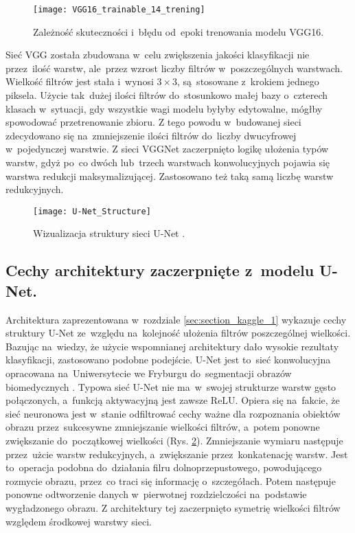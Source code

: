 {\begin{figure}[h!]
	\centering
	\centering
		\texttt{[image: VGG16\_trainable\_14\_trening]}	
	\caption{Zależność skuteczności i~błędu od~epoki trenowania modelu VGG16.}
	\label{fig:VGG16_trainable_14_trening}
\end{figure}

Sieć VGG została zbudowana w~celu zwiększenia jakości klasyfikacji nie przez~ilość warstw, ale~przez wzrost liczby filtrów w~poszczególnych warstwach. Wielkość filtrów jest stała i~wynosi $3\times3$, są~stosowane z~krokiem jednego piksela. Użycie tak~dużej ilości filtrów do~stosunkowo małej bazy o~czterech klasach w~sytuacji, gdy wszystkie wagi modelu byłyby edytowalne, mógłby spowodować przetrenowanie zbioru. Z tego powodu w~budowanej sieci zdecydowano się na~zmniejszenie ilości filtrów do~liczby dwucyfrowej w~pojedynczej warstwie. Z sieci VGGNet zaczerpnięto logikę ułożenia typów warstw, gdyż po~co dwóch lub~trzech warstwach konwolucyjnych pojawia się warstwa redukcji maksymalizującej. Zastosowano też taką samą liczbę warstw redukcyjnych.

\begin{figure}[h!]
	\centering
	\centering
		\texttt{[image: U-Net\_Structure]}	
	\caption{Wizualizacja struktury sieci U-Net \cite{Silburt2019LunarCI}.}
	\label{fig:u-net_structure}
\end{figure}

}

\subsection{Cechy architektury zaczerpnięte z~modelu U-Net.}

Architektura zaprezentowana w~rozdziale \ref{sec:section_kaggle_1} wykazuje cechy struktury U-Net ze~względu na~kolejność ułożenia filtrów poszczególnej wielkości. Bazując na~wiedzy, że użycie wspomnianej architektury dało wysokie rezultaty klasyfikacji, zastosowano podobne podejście. U-Net jest to~sieć konwolucyjna opracowana na~Uniwersytecie we Fryburgu do~segmentacji obrazów biomedycznych \cite{Ronneberger2015UNetCN}. Typowa sieć U-Net nie ma~w~swojej strukturze warstw gęsto połączonych, a~funkcją aktywacyjną jest zawsze ReLU. Opiera się na~fakcie, że sieć neuronowa jest w~stanie odfiltrować cechy ważne dla rozpoznania obiektów obrazu przez~sukcesywne zmniejszanie wielkości filtrów, a~potem ponowne zwiększanie do~początkowej wielkości (Rys. \ref{fig:u-net_structure}). Zmniejszanie wymiaru następuje przez~użcie warstw redukcyjnych, a~zwiększanie przez~konkatenację warstw. Jest to~operacja podobna do~działania filru dolnoprzepustowego, powodującego rozmycie obrazu, przez~co traci się informację o~szczegółach. Potem następuje ponowne odtworzenie danych w~pierwotnej rozdzielczości na~podstawie wygładzonego obrazu. Z architektury tej zaczerpnięto symetrię wielkości filtrów względem środkowej warstwy sieci.

